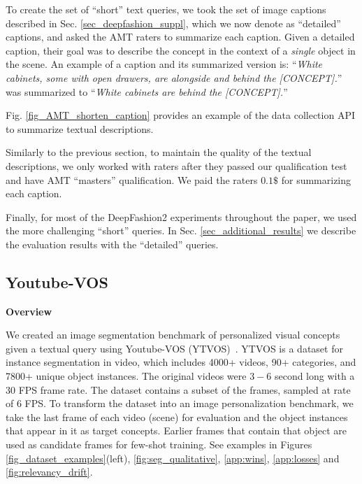 \documentclass[runningheads]{llncs}
\newcommand{\secref}[1]{Sec. \ref{#1}}
\newcommand{\figref}[1]{Fig. \ref{#1}}
\newcommand{\concept}{[CONCEPT]}
\begin{document}
To create the set of ``short'' text queries, we took the set of image captions described in \secref{sec_deepfashion_suppl}, which we now denote as ``detailed'' captions, and asked the AMT raters to summarize each caption. Given a detailed caption, their goal was to describe the concept in the context of a \textit{single} object in the scene.
An example of a caption and its summarized version is:
``\textit{White cabinets, some with open drawers, are alongside and behind the \concept{}.}'' was summarized to ``\textit{White cabinets are behind the \concept{}.}''

\figref{fig_AMT_shorten_caption} provides an example of the data collection API to summarize textual descriptions.

Similarly to the previous section, to maintain the quality of the textual descriptions, we only worked with raters after they passed our qualification test and have AMT ``masters'' qualification.
We paid the raters $0.1\$$ for summarizing each caption.


Finally, for most of the DeepFashion2 experiments throughout the paper, we used the more challenging ``short'' queries. In \secref{sec_additional_results} we describe the evaluation results with the ``detailed'' queries.


\subsection{Youtube-VOS}
\label{app:ytvos_details}
\vspace{5pt}\noindent\textbf{Overview}

We created an image segmentation benchmark of personalized visual concepts given a textual query using Youtube-VOS (YTVOS)~\cite{xu2018youtube}. YTVOS is a dataset for instance segmentation in video, which includes 4000+ videos, 90+ categories, and 7800+ unique object instances. The original videos were $3-6$ second long with a 30 FPS frame rate. The dataset contains a subset of the frames, sampled at rate of 6 FPS. To transform the dataset into an image personalization benchmark, we take the last frame of each video (scene) for evaluation and the object instances that appear in it as target concepts. Earlier frames that contain that object are used as candidate frames for few-shot training. See examples in Figures \ref{fig_dataset_examples}(left), \ref{fig:seg_qualitative}, \ref{app:wins}, \ref{app:losses} and \ref{fig:relevancy_drift}.
\end{document}
